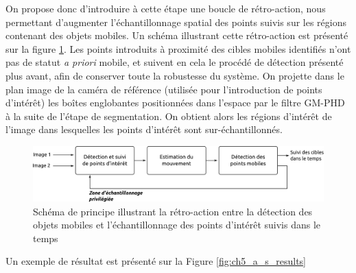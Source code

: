 On propose donc d'introduire à cette étape une boucle de rétro-action, nous permettant d'augmenter l'échantillonnage spatial des points suivis sur les régions contenant des objets mobiles. Un schéma illustrant cette rétro-action est présenté sur la figure \ref{fig:ch5_adaptative_sampling}. Les points introduits à proximité des cibles mobiles identifiés n'ont pas de statut \textit{a priori} mobile, et suivent en cela le procédé de détection présenté plus avant, afin de conserver toute la robustesse du système. On projette dans le plan image de la caméra de référence (utilisée pour l'introduction de points d'intérêt) les boîtes englobantes positionnées dans l'espace par le filtre GM-PHD à la suite de l'étape de segmentation. On obtient alors les régions d'intérêt de l'image dans lesquelles les points d'intérêt sont sur-échantillonnés.

\begin{figure}
	\includegraphics[width=\textwidth]{Chapter5/graphics/adaptative_sampling.png} 
	\caption{Schéma de principe illustrant la rétro-action entre la détection des objets mobiles et l'échantillonnage des points d'intérêt suivis dans le temps}	
	\label{fig:ch5_adaptative_sampling}
\end{figure}

Un exemple de résultat est présenté sur la Figure \ref{fig:ch5_a_s_results}

